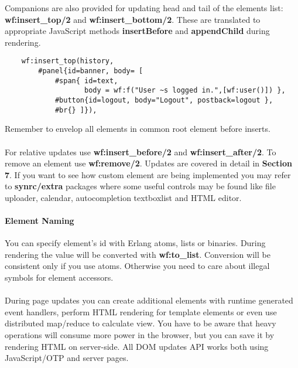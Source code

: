Companions are also provided for updating head and tail
of the elements list: {\bf wf:insert\_top/2} and
{\bf wf:insert\_bottom/2}. These are translated to appropriate
JavaScript methods {\bf insertBefore} and {\bf appendChild} during rendering.

\vspace{1\baselineskip}
\begin{lstlisting}
    wf:insert_top(history,
        #panel{id=banner, body= [
            #span{ id=text,
                   body = wf:f("User ~s logged in.",[wf:user()]) },
            #button{id=logout, body="Logout", postback=logout },
            #br{} ]}),
\end{lstlisting}
\vspace{1\baselineskip}

Remember to envelop all elements in common root element before inserts.

\paragraph{}
For relative updates use {\bf wf:insert\_before/2} and {\bf wf:insert\_after/2}.
To remove an element use {\bf wf:remove/2}.
Updates are covered in detail in {\bf Section 7}.
If you want to see how custom element are being implemented you may refer
to {\bf synrc/extra} packages where some useful controls may be found like
file uploader, calendar, autocompletion textboxlist and HTML editor.

\paragraph{\bf Element Naming}
You can specify element's id with Erlang atoms,
lists or binaries. During rendering the value will be converted
with {\bf wf:to\_list}. Conversion will be consistent only if you use atoms.
Otherwise you need to care about illegal symbols for element accessors.

\paragraph{}
During page updates you can create additional elements with
runtime generated event handlers, perform HTML rendering for
template elements or even use distributed map/reduce to calculate view.
You have to be aware that heavy operations will consume
more power in the browser, but you can save it by rendering
HTML on server-side. All DOM updates API works both using
JavaScript/OTP and server pages.

